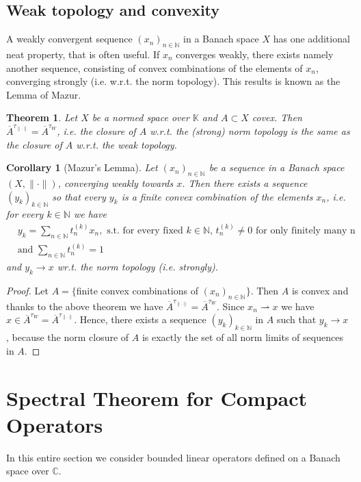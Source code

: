 \documentclass[11pt,a4paper]{article}
\newtheorem{thm}{Theorem}[section]
\newtheorem{cor}{Corollary}[section]
\theoremstyle{definition}
\newcommand{\wto}{\rightharpoonup}
\begin{document}
\subsection{Weak topology and convexity}
A weakly convergent sequence $(x_n)_{n \in \mathbb{N}}$ in a Banach space $X$ has one additional neat property, that is often useful. If $x_n$ converges weakly, there exists namely another sequence, consisting of convex combinations of the elements of $x_n$, converging strongly (i.e. w.r.t. the norm topology). This results is known as the Lemma of Mazur. 
\begin{thm} Let $X$ be a normed space over $\mathbb{K}$ and $A \subset X$ covex. Then $\overline{A}^{\tau_{\| \cdot \|}} = \overline{A}^{ \tau_W}$, i.e. the closure of $A$ w.r.t. the (strong) norm topology is the same as the closure of $A$ w.r.t. the weak topology. 
\end{thm}
\begin{cor}[Mazur's Lemma] Let $(x_n)_{n \in \mathbb{N}}$ be a sequence in a Banach space $(X, \| \cdot \|)$, converging weakly towards $x$. Then there exists a sequence $(y_k)_{k \in \mathbb{N}}$ so that every $y_k$ is a finite convex combination of the elements $x_n$, i.e. for every $k \in \mathbb{N}$ we have
\begin{align*}
&y_k = \sum_{n \in \mathbb{N}} t_n^{(k)} x_n, \text{ s.t. for every fixed $k \in \mathbb{N}$, } t_n^{(k)} \neq 0 \text{ for only finitely many n} \\
&\text{and } \sum_{n \in \mathbb{N}} t_n^{(k)} = 1
\end{align*}
and $y_k \to x$ wr.t. the norm topology (i.e. strongly). 
\end{cor}
\begin{proof}
Let $A= \lbrace$finite convex combinations of $(x_n)_{n \in \mathbb{N}} \rbrace$. Then $A$ is convex and thanks to the above theorem we have $\overline{A}^{ \tau_{ \| \cdot \|}} = \overline{A}^{ \tau_W}$. Since $x_n \wto x $ we have $x \in \overline{A}^{ \tau_W}=\overline{A}^{ \tau_{ \| \cdot \|}}$. Hence, there exists a sequence $(y_k)_{k \in \mathbb{N}}$ in $A$ such that $y_k \to x$, because the norm closure of $A$ is exactly the set of all norm limits of sequences in $A$. 
\end{proof}
\newpage
\section{Spectral Theorem for Compact Operators}
In this entire section we consider bounded linear operators defined on a Banach space over $\mathbb{C}$.
\end{document}
